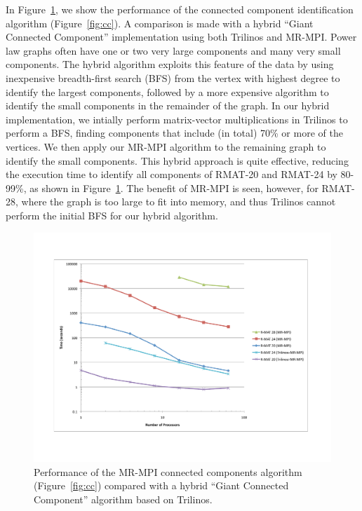 In Figure~\ref{f:cc}, we show the performance of the connected
component identification algorithm (Figure~\ref{fig:cc}).  A
comparison is made with a hybrid ``Giant Connected Component''
implementation using both Trilinos and MR-MPI.  Power law graphs often
have one or two very large components and many very small components.
The hybrid algorithm exploits this feature of the data by using
inexpensive breadth-first search (BFS) from the vertex with highest
degree to identify the largest components, followed by a more
expensive algorithm to identify the small components in the remainder
of the graph.  In our hybrid implementation, we intially perform
matrix-vector multiplications in Trilinos to perform a BFS, finding
components that include (in total) 70\% or more of the vertices.  We
then apply our MR-MPI algorithm to the remaining graph to identify the
small components.  This hybrid approach is quite effective, reducing
the execution time to identify all components of RMAT-20 and RMAT-24
by 80-99\%, as shown in Figure~\ref{f:cc}.  The benefit of MR-MPI is
seen, however, for RMAT-28, where the graph is too large to fit into
memory, and thus Trilinos cannot perform the initial BFS for our
hybrid algorithm.

\begin{figure}[htb]
\includegraphics[width=\textwidth]{fig_cc.pdf}
\caption{Performance of the MR-MPI connected components algorithm (Figure~\ref{fig:cc}) compared with a hybrid ``Giant Connected Component'' algorithm based
on Trilinos.}
\label{f:cc}
\end{figure}

